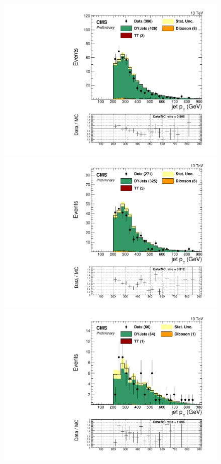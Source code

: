 \begin{figure}[h]
\begin{center}
\includegraphics[scale=0.37]{figures/control/ptZjjMLP.pdf}
\includegraphics[scale=0.37]{figures/control/ptZjjELP.pdf}\\[2cm]
\includegraphics[scale=0.37]{figures/control/ptZjjMHP.pdf}

\end{center}
\end{figure}
